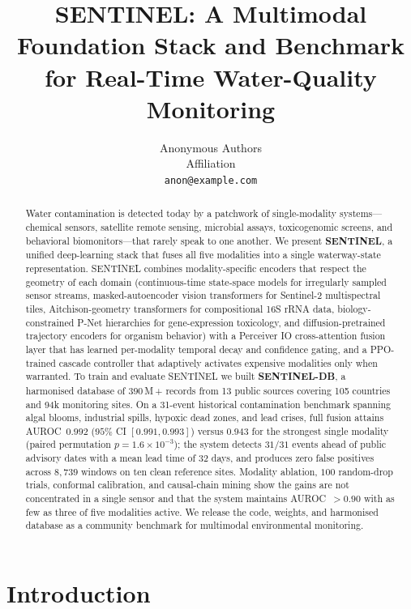 \documentclass{article}
\title{SENTINEL: A Multimodal Foundation Stack and Benchmark for Real-Time Water-Quality Monitoring}
\author{%
  Anonymous Authors\\
  Affiliation\\
  \texttt{anon@example.com}
}
\begin{document}
\maketitle

\begin{abstract}
Water contamination is detected today by a patchwork of single-modality systems---chemical sensors, satellite remote sensing, microbial assays, toxicogenomic screens, and behavioral biomonitors---that rarely speak to one another. We present \textbf{SENTINEL}, a unified deep-learning stack that fuses all five modalities into a single waterway-state representation. SENTINEL combines modality-specific encoders that respect the geometry of each domain (continuous-time state-space models for irregularly sampled sensor streams, masked-autoencoder vision transformers for Sentinel-2 multispectral tiles, Aitchison-geometry transformers for compositional 16S rRNA data, biology-constrained P-Net hierarchies for gene-expression toxicology, and diffusion-pretrained trajectory encoders for organism behavior) with a Perceiver IO cross-attention fusion layer that has learned per-modality temporal decay and confidence gating, and a PPO-trained cascade controller that adaptively activates expensive modalities only when warranted. To train and evaluate SENTINEL we built \textbf{SENTINEL-DB}, a harmonised database of $390$\,M\,+ records from 13 public sources covering 105 countries and 94k monitoring sites. On a 31-event historical contamination benchmark spanning algal blooms, industrial spills, hypoxic dead zones, and lead crises, full fusion attains AUROC~$0.992$ ($95\%$ CI $[0.991,0.993]$) versus $0.943$ for the strongest single modality (paired permutation $p\!=\!1.6\!\times\!10^{-3}$); the system detects $31/31$ events ahead of public advisory dates with a mean lead time of $32$ days, and produces zero false positives across $8{,}739$ windows on ten clean reference sites. Modality ablation, $100$ random-drop trials, conformal calibration, and causal-chain mining show the gains are not concentrated in a single sensor and that the system maintains AUROC~$>\!0.90$ with as few as three of five modalities active. We release the code, weights, and harmonised database as a community benchmark for multimodal environmental monitoring.
\end{abstract}

\section{Introduction}
\label{sec:intro}
\end{document}

